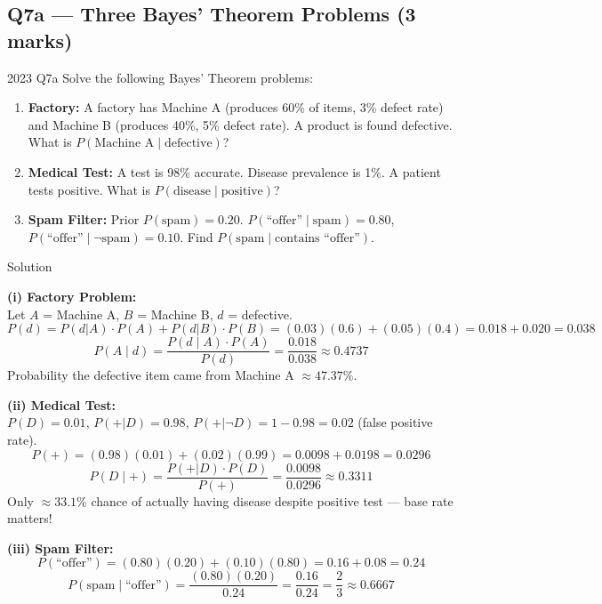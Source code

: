 \documentclass[12pt,a4paper]{article}
\begin{document}
\subsection{Q7a --- Three Bayes' Theorem Problems (3 marks)}

\begin{qbox}{2023 Q7a}
Solve the following Bayes' Theorem problems:
\begin{enumerate}[label=(\roman*)]
  \item \textbf{Factory:} A factory has Machine A (produces 60\% of items, 3\% defect rate) and Machine B (produces 40\%, 5\% defect rate). A product is found defective. What is $P(\text{Machine A} \mid \text{defective})$?
  \item \textbf{Medical Test:} A test is 98\% accurate. Disease prevalence is 1\%. A patient tests positive. What is $P(\text{disease} \mid \text{positive})$?
  \item \textbf{Spam Filter:} Prior $P(\text{spam})=0.20$. $P(\text{``offer''} \mid \text{spam})=0.80$, $P(\text{``offer''} \mid \neg\text{spam})=0.10$. Find $P(\text{spam} \mid \text{contains ``offer''})$.
\end{enumerate}
\end{qbox}

\begin{solbox}{Solution}

\textbf{(i) Factory Problem:}\\
Let $A$ = Machine A, $B$ = Machine B, $d$ = defective.
\[
P(d) = P(d|A)\cdot P(A) + P(d|B)\cdot P(B) = (0.03)(0.6) + (0.05)(0.4) = 0.018 + 0.020 = 0.038
\]
\[
P(A \mid d) = \frac{P(d \mid A)\cdot P(A)}{P(d)} = \frac{0.018}{0.038} \approx \boxed{0.4737}
\]
Probability the defective item came from Machine A $\approx 47.37\%$.

\medskip
\textbf{(ii) Medical Test:}\\
$P(D)=0.01$, $P(+|D)=0.98$, $P(+|\neg D)=1-0.98=0.02$ (false positive rate).
\[
P(+) = (0.98)(0.01) + (0.02)(0.99) = 0.0098 + 0.0198 = 0.0296
\]
\[
P(D \mid +) = \frac{P(+|D)\cdot P(D)}{P(+)} = \frac{0.0098}{0.0296} \approx \boxed{0.3311}
\]
Only $\approx 33.1\%$ chance of actually having disease despite positive test --- base rate matters!

\medskip
\textbf{(iii) Spam Filter:}
\[
P(\text{``offer''}) = (0.80)(0.20) + (0.10)(0.80) = 0.16 + 0.08 = 0.24
\]
\[
P(\text{spam} \mid \text{``offer''}) = \frac{(0.80)(0.20)}{0.24} = \frac{0.16}{0.24} = \frac{2}{3} \approx \boxed{0.6667}
\]
\end{solbox}
\end{document}
